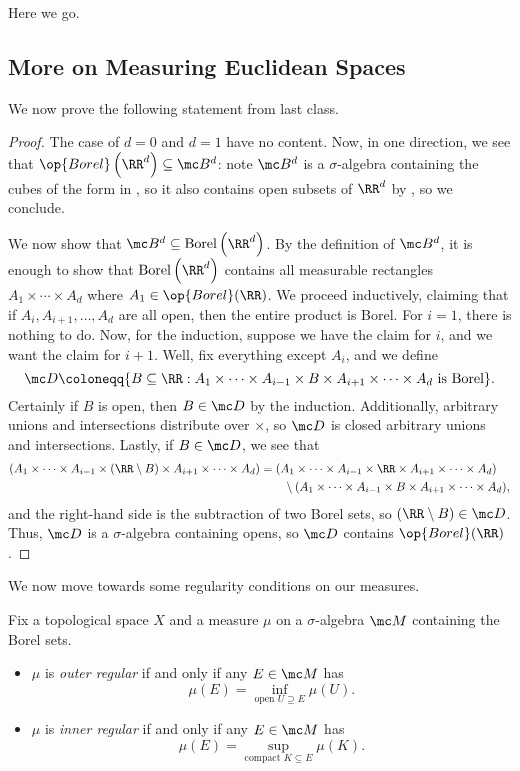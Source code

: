 \documentclass[../notes.tex]{subfiles}
\begin{document}
Here we go.

\subsection{More on Measuring Euclidean Spaces}
We now prove the following statement from last class.
\rdalgebra*
\begin{proof}
	The case of $d=0$ and $d=1$ have no content. Now, in one direction, we see that $\op{Borel}\left(\RR^d\right)\subseteq\mc B^d$: note $\mc B^d$ is a $\sigma$-algebra containing the cubes of the form in , so it also contains open subsets of $\RR^d$ by , so we conclude.

	We now show that $\mc B^d\subseteq\mathrm{Borel}\left(\RR^d\right)$. By the definition of $\mc B^d$, it is enough to show that $\mathrm{Borel}\left(\RR^d\right)$ contains all measurable rectangles $A_1\times\cdots\times A_d$ where $A_1\in\op{Borel}(\RR)$. We proceed inductively, claiming that if $A_i,A_{i+1},\ldots,A_d$ are all open, then the entire product is Borel. For $i=1$, there is nothing to do. Now, for the induction, suppose we have the claim for $i$, and we want the claim for $i+1$. Well, fix everything except $A_i$, and we define
	\[\mc D\coloneqq\{B\subseteq\RR:A_1\times\cdots\times A_{i-1}\times B\times A_{i+1}\times\cdots\times A_d\text{ is Borel}\}.\]
	Certainly if $B$ is open, then $B\in\mc D$ by the induction. Additionally, arbitrary unions and intersections distribute over $\times$, so $\mc D$ is closed arbitrary unions and intersections. Lastly, if $B\in\mc D$, we see that
	\begin{align*}
		(A_1\times\cdots\times A_{i-1}\times (\RR\setminus B)\times A_{i+1}\times\cdots\times A_d) &= (A_1\times\cdots\times A_{i-1}\times \RR\times A_{i+1}\times\cdots\times A_d) \\
		&\qquad\setminus(A_1\times\cdots\times A_{i-1}\times B\times A_{i+1}\times\cdots\times A_d),
	\end{align*}
	and the right-hand side is the subtraction of two Borel sets, so $(\RR\setminus B)\in\mc D$. Thus, $\mc D$ is a $\sigma$-algebra containing opens, so $\mc D$ contains $\op{Borel}(\RR)$.
\end{proof}
We now move towards some regularity conditions on our measures.
\begin{definition}[regular]
	Fix a topological space $X$ and a measure $\mu$ on a $\sigma$-algebra $\mc M$ containing the Borel sets.
	\begin{itemize}
		\item $\mu$ is \textit{outer regular} if and only if any $E\in\mc M$ has
		\[\mu(E)=\inf_{\text{open }U\supseteq E}\mu(U).\]
		\item $\mu$ is \textit{inner regular} if and only if any $E\in\mc M$ has
		\[\mu(E)=\sup_{\text{compact }K\subseteq E}\mu(K).\]
	\end{itemize}
\end{definition}
\end{document}
